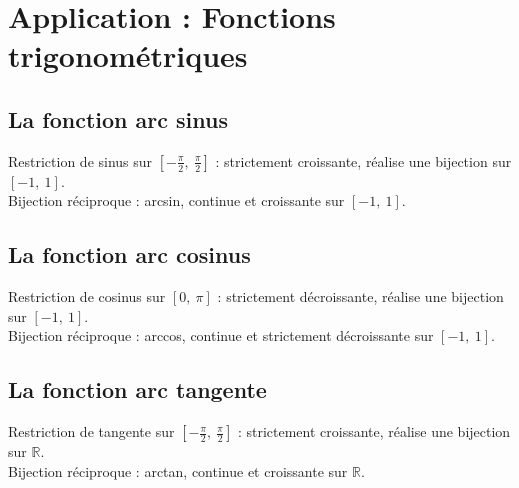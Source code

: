 \section{Application : Fonctions trigonométriques}\label{sec:application---fonctions-trigonometriques}

\subsection{La fonction arc sinus}\label{subsec:la-fonction-arc-sinus}

Restriction de sinus sur $[-\frac{\pi}{2},\ \frac{\pi}{2}]$ : strictement croissante, réalise une bijection sur $[-1,\ 1]$.\\
Bijection réciproque : arcsin, continue et croissante sur $[-1,\ 1]$.

\subsection{La fonction arc cosinus}\label{subsec:la-fonction-arc-cosunus}

Restriction de cosinus sur $[0,\ \pi]$ : strictement décroissante, réalise une bijection sur $[-1,\ 1]$.\\
Bijection réciproque : arccos, continue et strictement décroissante sur $[-1,\ 1]$.

\subsection{La fonction arc tangente}\label{subsec:la-fonction-arc-tangente}

Restriction de tangente sur $[-\frac{\pi}{2},\ \frac{\pi}{2}]$ : strictement croissante, réalise une bijection sur $\mathbb{R}$.\\
Bijection réciproque : arctan, continue et croissante sur $\mathbb{R}$.



